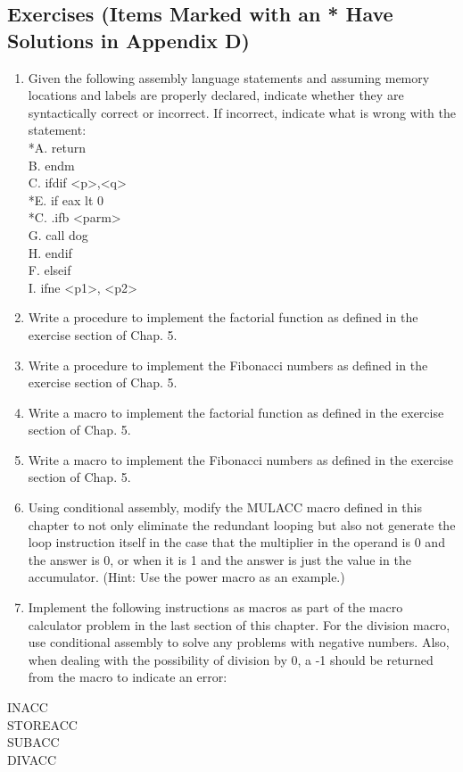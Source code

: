 \documentclass[10pt]{book}
\begin{document}
\subsection{Exercises (Items Marked with an * Have Solutions in Appendix D)}
\begin{enumerate}
  \item Given the following assembly language statements and assuming memory locations and labels are properly declared, indicate whether they are syntactically correct or incorrect. If incorrect, indicate what is wrong with the statement:\\
*A. return\\
B. endm\\
C. ifdif <p>,<q>\\
*E. if eax lt 0\\
*C. .ifb <parm>\\
G. call dog\\
H. endif\\
F. elseif\\
I. ifne <p1>, <p2>
  \item Write a procedure to implement the factorial function as defined in the exercise section of Chap. 5.
  \item Write a procedure to implement the Fibonacci numbers as defined in the exercise section of Chap. 5.
  \item Write a macro to implement the factorial function as defined in the exercise section of Chap. 5.
  \item Write a macro to implement the Fibonacci numbers as defined in the exercise section of Chap. 5.
  \item Using conditional assembly, modify the MULACC macro defined in this chapter to not only eliminate the redundant looping but also not generate the loop instruction itself in the case that the multiplier in the operand is 0 and the answer is 0, or when it is 1 and the answer is just the value in the accumulator. (Hint: Use the power macro as an example.)
  \item Implement the following instructions as macros as part of the macro calculator problem in the last section of this chapter. For the division macro, use conditional assembly to solve any problems with negative numbers. Also, when dealing with the possibility of division by 0, a -1 should be returned from the macro to indicate an error:
\end{enumerate}
INACC\\
STOREACC\\
SUBACC\\
DIVACC
\end{document}
